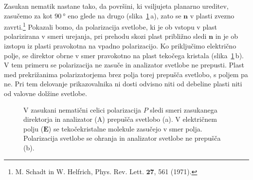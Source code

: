 Zasukan  nematik nastane tako, da površini, ki vsiljujeta planarno ureditev,
zasučemo za kot $90~\si{\degree}$ eno glede na drugo (slika~\ref{LCD1}\,a), zato se $\mathbf{n}$ 
v plasti zvezno zavrti.\footnote{M. 
Schadt in W. Helfrich, Phys. Rev. Lett. $\mathbf{27}$, 561 (1971).}
Pokazali bomo, da polarizacija svetlobe, ki je ob vstopu 
v plast polarizirana v smeri urejanja, pri prehodu skozi plast približno
sledi $\mathbf{n}$ in je ob izstopu iz plasti pravokotna
na vpadno polarizacijo. Ko priključimo električno polje, se direktor 
obrne v smer pravokotno na plast tekočega kristala (slika~\ref{LCD1}\,b). V tem primeru 
se polarizacija ne zasuče in analizator svetlobe ne prepusti. Plast med prekrižanima
polarizatorjema brez polja torej prepušča svetlobo, s poljem pa ne. Pri tem
delovanje prikazovalnika ni dosti odvisno niti od debeline plasti niti
od valovne dolžine svetlobe. 
\begin{figure}[ht]
\centering
\def\svgwidth{90truemm} 

\caption{V zasukani nematični celici polarizacija $P$ sledi smeri zasukanega 
direktorja in analizator (A) prepušča svetlobo (a). V električnem polju 
($\mathbf{E}$) se tekočekristalne molekule zasučejo v smer polja. 
Polarizacija svetlobe se ohranja in analizator svetlobe ne prepušča (b).}
\label{LCD1}
\end{figure}

